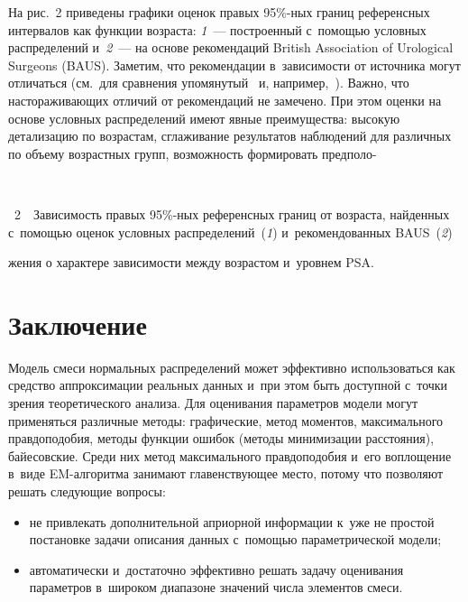 \begin{multicols}{2}
На рис.~2 приведены графики оценок правых 95\%-ных границ
референсных интервалов как функции возраста: \textit{1}~--- построенный с~помощью
условных распределений и~\textit{2}~--- на основе
рекомендаций British Association of Urological Surgeons (BAUS). Заметим, что
рекомендации в~зависимости от источника могут отличаться (см.\ для
сравнения\linebreak
 упомянутый~\cite{13-kri} и, например,~\cite{14-kri}). Важно, что\linebreak
настораживающих отличий от рекомендаций не замечено. При этом оценки на
основе условных распределений имеют явные преимущества: высокую
детализацию по возрастам, сглаживание результатов наблюдений для
различных по объему возрастных групп, возможность формировать
предполо-\linebreak\vspace*{-12pt}

\begin{center}  %
\vspace*{1pt}
 \mbox{%
 \epsfxsize=77.189mm
 }
\end{center}

\vspace*{3pt}

\noindent
{{\figurename~2}\ \ \small{Зависимость правых 95\%-ных референсных границ от возраста,
найденных с~по\-мощью оценок условных распределений~(\textit{1})
и~рекомендованных BAUS~(\textit{2})}}

\vspace*{9pt}

\noindent
жения о характере зависимости между возрастом и~уровнем PSA.


\section{Заключение}

     Модель смеси нормальных распределений может эффективно
использоваться как средство аппроксимации реальных данных и~при этом быть
доступной с~точки зрения теоретического анализа. Для оценивания параметров
модели могут применяться различные методы: графические, метод моментов,
максимального правдоподобия, методы функции ошибок (методы
минимизации расстояния), байесовские. Среди них метод максимального
правдоподобия и~его воплощение в~виде EM-ал\-го\-рит\-ма занимают
главенствующее место, потому что позволяют решать следующие вопросы:
     \begin{itemize}
\item не привлекать дополнительной априорной информации к~уже не простой
постановке задачи описания данных с~помощью параметрической модели;
\item автоматически и~достаточно эффективно решать задачу
оценивания параметров в~широком диапазоне значений числа
элементов смеси.
\end{itemize}


\end{multicols}
